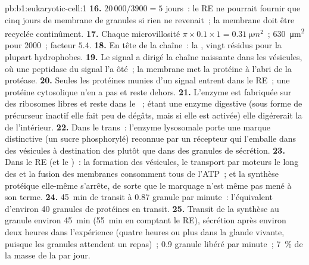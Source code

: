 \begin{solution}{pb:b1:eukaryotic-cell:1}
\textbf{16.} $20\,000/3900 = 5$ jours~: le RE ne pourrait fournir que
cinq jours de membrane de granules si rien ne revenait~; la membrane
doit être recyclée continûment.
\textbf{17.} Chaque microvillosité $\pi\times 0.1\times 1 =
\qty{0.31}{\micro m^2}$~; \qty{630}{\micro m^2} pour 2000~; facteur
$5.4$.
\textbf{18.} En tête de la chaîne~: la , vingt résidus
pour la plupart hydrophobes.
\textbf{19.} Le signal a dirigé la chaîne naissante dans les vésicules,
où une peptidase du signal l'a ôté~; la membrane met la protéine à
l'abri de la protéase.
\textbf{20.} Seules les protéines munies d'un signal entrent dans le
RE~; une protéine cytosolique n'en a pas et reste dehors.
\textbf{21.} L'enzyme est fabriquée sur des ribosomes libres et reste
dans le ~; étant une enzyme digestive (sous forme de précurseur
inactif elle fait peu de dégâts, mais si elle est activée) elle
digérerait la  de l'intérieur.
\textbf{22.} Dans le  trans~: l'enzyme lysosomale porte une marque
distinctive (un sucre phosphorylé) reconnue par un récepteur qui
l'emballe dans des vésicules à destination des  plutôt que dans
des granules de sécrétion.
\textbf{23.} Dans le RE (et le )~: la formation des vésicules, le
transport par moteurs le long des  et la fusion des
membranes consomment tous de l'ATP~; et la synthèse protéique elle-même
s'arrête, de sorte que le marquage n'est même pas mené à son terme.
\textbf{24.} \qty{45}{min} de transit à $0.87$ granule par minute~:
l'équivalent d'environ \qty{40}{} granules de protéines en transit.
\textbf{25.} Transit de la synthèse au granule environ \qty{45}{min}
(\qty{55}{min} en comptant le RE), sécrétion après environ deux heures
dans l'expérience (quatre heures ou plus dans la glande vivante,
puisque les granules attendent un repas)~; \qty{0.9}{} granule libéré
par minute~; \qty{7}{\%} de la masse de la  par jour.
\end{solution}
